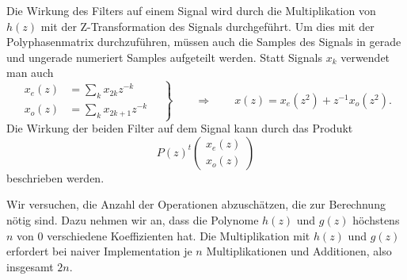 Die Wirkung des Filters auf einem Signal wird durch die Multiplikation
von $h(z)$ mit der Z-Transformation des Signals durchgeführt.
Um dies mit der Polyphasenmatrix durchzuführen, müssen auch die Samples
des Signals in gerade und ungerade numeriert Samples aufgeteilt werden.
Statt Signals $x_k$ verwendet man auch
\[
\left.
\begin{aligned}
x_e(z) &= \sum_k x_{2k}z^{-k} \\
x_o(z) &= \sum_k x_{2k+1}z^{-k}
\end{aligned}
\quad\right\}
\qquad
\Rightarrow
\qquad
x(z) = x_e(z^2) + z^{-1} x_o(z^2).
\]
Die Wirkung der beiden Filter auf dem Signal kann durch das Produkt
\[
P(z)^t \begin{pmatrix} x_e(z)\\ x_o(z) \end{pmatrix}
\]
beschrieben werden.

Wir versuchen, die Anzahl der Operationen abzuschätzen, die zur
Berechnung nötig sind.
Dazu nehmen wir an, dass die Polynome $h(z)$ und $g(z)$ höchstens $n$
von $0$ verschiedene Koeffizienten hat.
Die Multiplikation mit $h(z)$ und $g(z)$ erfordert bei naiver 
Implementation je $n$ Multiplikationen und Additionen, also
insgesamt $2n$.

